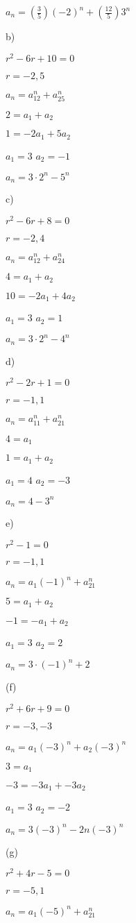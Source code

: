 $a_n = (\frac{3}{5})(-2)^n + (\frac{12}{5})3^n$

b)

$r^2 - 6r +10 = 0$

$r=-2,5$

$a_n = a_12^n + a_25^n$

$2 = a_1 + a_2$

$1= -2a_1 + 5a_2$

$a_1 = 3$ $a_2 = -1$

$a_n = 3 \cdot 2^n - 5^n$

c) 

$r^2 - 6r +8 = 0$

$r=-2,4$

$a_n = a_12^n + a_24^n$

$4 = a_1 + a_2$

$10= -2a_1 + 4a_2$

$a_1 = 3$ $a_2 = 1$

$a_n = 3 \cdot 2^n - 4^n$

d) 

$r^2 - 2r +1 = 0$

$r=-1,1$

$a_n = a_11^n + a_21^n$

$4 = a_1 $

$1= a_1 + a_2$

$a_1 = 4$ $a_2 = -3$

$a_n = 4  - 3^n$

e)

$r^2 - 1 = 0$

$r=-1,1$

$a_n = a_1(-1)^n + a_21^n$

$5 = a_1 + a_2$

$-1= -a_1 + a_2$

$a_1 = 3$ $a_2 = 2$

$a_n = 3 \cdot (-1)^n +2$

(f)

$r^2 + 6r + 9 = 0$

$r=-3,-3$

$a_n = a_1(-3)^n + a_2(-3)^n$

$3 = a_1$

$-3= -3a_1 +-3a_2$

$a_1 = 3$ $a_2 = -2$

$a_n = 3(-3)^n - 2n(-3)^n$

(g)

$r^2 +4r -5 = 0$

$r=-5,1$

$a_n = a_1(-5)^n + a_21^n$

